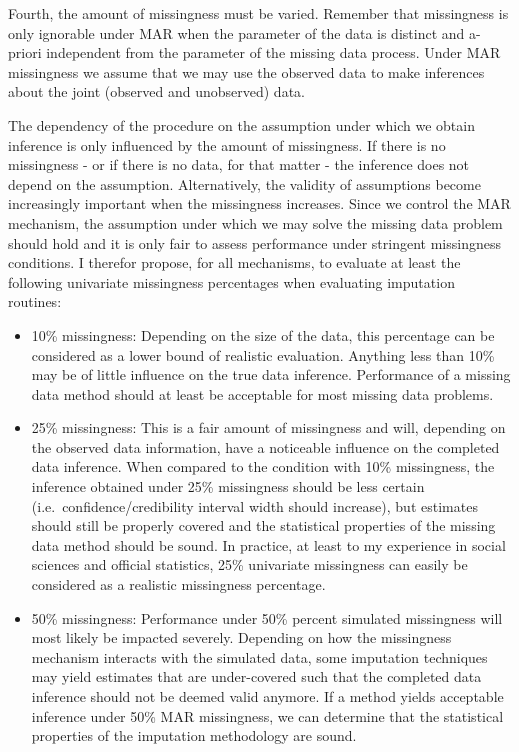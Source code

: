 \documentclass[
]{article}
\providecommand{\tightlist}{%
  \setlength{\itemsep}{0pt}\setlength{\parskip}{0pt}}
\begin{document}
Fourth, the amount of missingness must be varied. Remember that
missingness is only ignorable under MAR when the parameter of the data
is distinct and a-priori independent from the parameter of the missing
data process. Under MAR missingness we assume that we may use the
observed data to make inferences about the joint (observed and
unobserved) data.

The dependency of the procedure on the assumption under which we obtain
inference is only influenced by the amount of missingness. If there is
no missingness - or if there is no data, for that matter - the inference
does not depend on the assumption. Alternatively, the validity of
assumptions become increasingly important when the missingness
increases. Since we control the MAR mechanism, the assumption under
which we may solve the missing data problem should hold and it is only
fair to assess performance under stringent missingness conditions. I
therefor propose, for all mechanisms, to evaluate at least the following
univariate missingness percentages when evaluating imputation routines:

\begin{itemize}
\tightlist
\item
  10\% missingness: Depending on the size of the data, this percentage
  can be considered as a lower bound of realistic evaluation. Anything
  less than 10\% may be of little influence on the true data inference.
  Performance of a missing data method should at least be acceptable for
  most missing data problems.
\item
  25\% missingness: This is a fair amount of missingness and will,
  depending on the observed data information, have a noticeable
  influence on the completed data inference. When compared to the
  condition with 10\% missingness, the inference obtained under 25\%
  missingness should be less certain (i.e.~confidence/credibility
  interval width should increase), but estimates should still be
  properly covered and the statistical properties of the missing data
  method should be sound. In practice, at least to my experience in
  social sciences and official statistics, 25\% univariate missingness
  can easily be considered as a realistic missingness percentage.
\item
  50\% missingness: Performance under 50\% percent simulated missingness
  will most likely be impacted severely. Depending on how the
  missingness mechanism interacts with the simulated data, some
  imputation techniques may yield estimates that are under-covered such
  that the completed data inference should not be deemed valid anymore.
  If a method yields acceptable inference under 50\% MAR missingness, we
  can determine that the statistical properties of the imputation
  methodology are sound.
\end{itemize}
\end{document}

